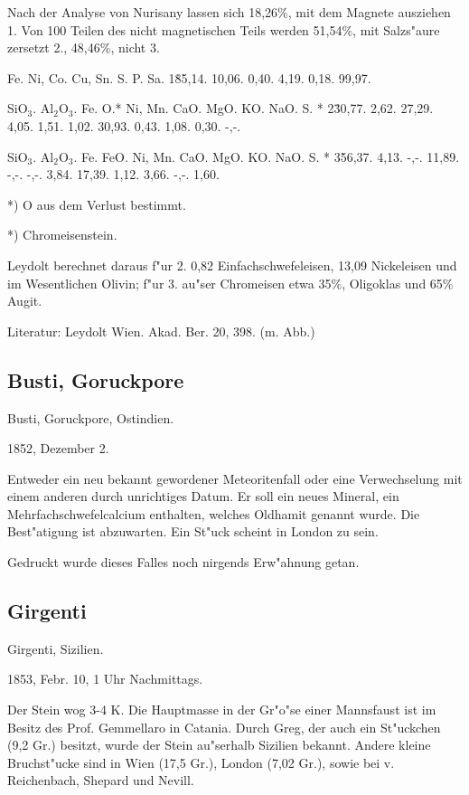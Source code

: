\documentclass[a4paper, 11pt, oneside]{article}
\begin{document}
Nach der Analyse von Nurisany lassen sich 18,26\%, mit dem Magnete ausziehen 1. Von 100 Teilen des nicht magnetischen Teils werden 51,54\%, mit Salzs"aure zersetzt 2., 48,46\%, nicht 3.

Fe. Ni, Co. Cu, Sn. S. P. Sa.  
1\. 85,14. 10,06. 0,40. 4,19. 0,18. 99,97.  

SiO$_{3}$. Al$_{2}$O$_{3}$. Fe. O.* Ni, Mn. CaO. MgO. KO. NaO. S. *  
2\. 30,77. 2,62. 27,29. 4,05. 1,51. 1,02. 30,93. 0,43. 1,08. 0,30. -,-.

SiO$_{3}$. Al$_{2}$O$_{3}$. Fe. FeO. Ni, Mn. CaO. MgO. KO. NaO. S. *  
3\. 56,37. 4,13. -,-. 11,89. -,-. -,-. 3,84. 17,39. 1,12. 3,66. -,-. 1,60.

*) O aus dem Verlust bestimmt.

*) Chromeisenstein.

Leydolt berechnet daraus f"ur 2. 0,82 Einfachschwefeleisen, 13,09 Nickeleisen und im Wesentlichen Olivin; f"ur 3. au"ser Chromeisen etwa 35\%, Oligoklas und 65\% Augit.

Literatur: Leydolt Wien. Akad. Ber. 20, 398. (m. Abb.)

\subsection{Busti, Goruckpore}

Busti, Goruckpore, Ostindien.

1852, Dezember 2.

Entweder ein neu bekannt gewordener Meteoritenfall oder eine Verwechselung mit einem anderen durch unrichtiges Datum. Er soll ein neues Mineral, ein Mehrfachschwefelcalcium enthalten, welches Oldhamit genannt wurde. Die Best"atigung ist abzuwarten. Ein St"uck scheint in London zu sein.

Gedruckt wurde dieses Falles noch nirgends Erw"ahnung getan.

\subsection{Girgenti}

Girgenti, Sizilien.

1853, Febr. 10, 1 Uhr Nachmittags.

Der Stein wog 3-4 K. Die Hauptmasse in der Gr"o"se einer Mannsfaust ist im Besitz des Prof. Gemmellaro in Catania. Durch Greg, der auch ein St"uckchen (9,2 Gr.) besitzt, wurde der Stein au"serhalb Sizilien bekannt. Andere kleine Bruchst"ucke sind in Wien (17,5 Gr.), London (7,02 Gr.), sowie bei v. Reichenbach, Shepard und Nevill.
\end{document}
